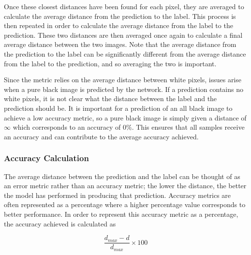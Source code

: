 Once these closest distances have been found for each pixel, they are averaged to calculate the average distance from the prediction to the label. This process is then repeated in order to calculate the average distance from the label to the prediction. These two distances are then averaged once again to calculate a final average distance between the two images. Note that the average distance from the prediction to the label can be significantly different from the average distance from the label to the prediction, and so averaging the two is important.

Since the metric relies on the average distance between white pixels, issues arise when a pure black image is predicted by the network. If a prediction contains no white pixels, it is not clear what the distance between the label and the prediction should be. It is important for a prediction of an all black image to achieve a low accuracy metric, so a pure black image is simply given a distance of $\infty$ which corresponds to an accuracy of 0\%. This ensures that all samples receive an accuracy and can contribute to the average accuracy achieved.


\subsubsection{Accuracy Calculation}

The average distance between the prediction and the label can be thought of as an error metric rather than an accuracy metric; the lower the distance, the better the model has performed in producing that prediction. Accuracy metrics are often represented as a percentage where a higher percentage value corresponds to better performance. In order to represent this accuracy metric as a percentage, the accuracy achieved is calculated as

\begin{equation}
    \frac{d_{max} - {d}}{d_{max}} \times 100
\end{equation}

